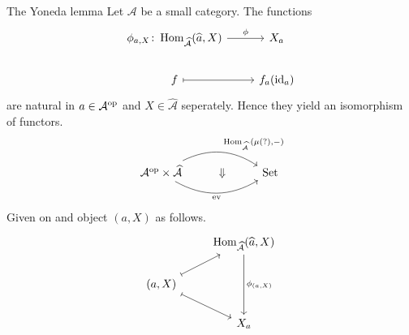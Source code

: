 \begin{thm}{The Yoneda lemma}
    Let $\mathcal{A}$ be a small category. The functions 
    \[
    \begin{tikzcd}
        \phi_{a,X}\colon \Hom_{\widehat{\mathcal{A}}}(\widehat{a},X) 
        \arrow[r,"\phi"]
        &
        X_a
        \\
        f
        \arrow[r,mapsto]
        &
        f_a(\id_a)
    \end{tikzcd}
    \] 
    are natural in $a \in \mathcal{A}^{\operatorname{op}}$ and $X \in  \widehat{\mathcal{A}}$ seperately.
    Hence they yield an isomorphism of functors.
    \[
    \begin{tikzcd}
        \mathcal{A}^{\op} \times \widehat{\mathcal{A}}
        \arrow[rr, bend left , "\Hom_{\presh{A}}{(\mu(?),-)}"]
        \arrow[rr , bend right , "\ev"']
        &
        \Downarrow
        &
        \Set
    \end{tikzcd}
    \]
    Given on and object $(a,X)$ as follows.
    \[
    \begin{tikzcd}
        & 
        \Hom_{\presh{A}}(\widehat{a},X)
        \arrow[dd,"\phi_{(a,X)}"]
        \\
        (a,X)
        \arrow[rd, mapsto]
        \arrow[ru, mapsto]
        &
        \\
        &
        X_a
    \end{tikzcd}
    \]
\end{thm}


    


